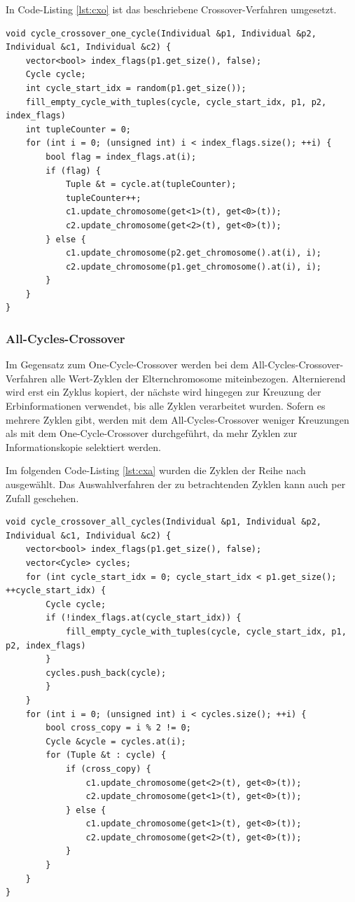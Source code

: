 In Code-Listing \ref{lst:cxo} ist das beschriebene Crossover-Verfahren umgesetzt.

\begin{minipage}{\linewidth}
\begin{lstlisting}[caption={Cycle-Crossover-One-Cycle}, firstnumber=1, captionpos=b, label=lst:cxo]
void cycle_crossover_one_cycle(Individual &p1, Individual &p2, Individual &c1, Individual &c2) {
	vector<bool> index_flags(p1.get_size(), false);
	Cycle cycle;
	int cycle_start_idx = random(p1.get_size());
	fill_empty_cycle_with_tuples(cycle, cycle_start_idx, p1, p2, index_flags)
	int tupleCounter = 0;
	for (int i = 0; (unsigned int) i < index_flags.size(); ++i) {
		bool flag = index_flags.at(i);
		if (flag) {
			Tuple &t = cycle.at(tupleCounter);
			tupleCounter++;
			c1.update_chromosome(get<1>(t), get<0>(t));
			c2.update_chromosome(get<2>(t), get<0>(t));
		} else {
 			c1.update_chromosome(p2.get_chromosome().at(i), i);
			c2.update_chromosome(p1.get_chromosome().at(i), i);
		}
	}
}
\end{lstlisting}
\end{minipage}

\subsubsection{All-Cycles-Crossover}
Im Gegensatz zum One-Cycle-Crossover werden bei dem All-Cycles-Crossover-Verfahren alle Wert-Zyklen der Elternchromosome miteinbezogen.
Alternierend wird erst ein Zyklus kopiert, der nächste wird hingegen zur Kreuzung der Erbinformationen verwendet, bis alle Zyklen verarbeitet wurden. Sofern es mehrere Zyklen gibt, werden mit dem All-Cycles-Crossover weniger Kreuzungen als mit dem One-Cycle-Crossover durchgeführt, da mehr Zyklen zur Informationskopie selektiert werden.

Im folgenden Code-Listing \ref{lst:cxa} wurden die Zyklen der Reihe nach ausgewählt. Das Auswahlverfahren der zu betrachtenden Zyklen kann auch per Zufall geschehen.

\begin{minipage}{\linewidth}
\begin{lstlisting}[caption={Cycle-Crossover-All-Cycles}, firstnumber=1, captionpos=b, label=lst:cxa]
void cycle_crossover_all_cycles(Individual &p1, Individual &p2, Individual &c1, Individual &c2) {
	vector<bool> index_flags(p1.get_size(), false);
	vector<Cycle> cycles;
	for (int cycle_start_idx = 0; cycle_start_idx < p1.get_size(); ++cycle_start_idx) {
		Cycle cycle;
		if (!index_flags.at(cycle_start_idx)) {
			fill_empty_cycle_with_tuples(cycle, cycle_start_idx, p1, p2, index_flags)
		}
		cycles.push_back(cycle);
		}
	}
	for (int i = 0; (unsigned int) i < cycles.size(); ++i) {
		bool cross_copy = i % 2 != 0;
		Cycle &cycle = cycles.at(i);
		for (Tuple &t : cycle) {
			if (cross_copy) {
				c1.update_chromosome(get<2>(t), get<0>(t));
				c2.update_chromosome(get<1>(t), get<0>(t));
			} else {
				c1.update_chromosome(get<1>(t), get<0>(t));	
 				c2.update_chromosome(get<2>(t), get<0>(t));
			}
		}
	}
}

\end{lstlisting}
\end{minipage}
